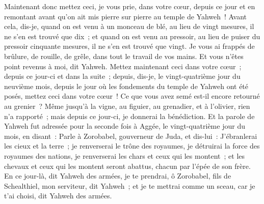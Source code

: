 \begin{multicols}{2}
Maintenant donc mettez ceci, je vous prie, dans votre cœur, depuis ce jour et en remontant avant qu'on ait mis pierre sur pierre au temple de Yahweh~!
Avant cela, dis-je, quand on est venu à un monceau de blé, au lieu de vingt mesures, il ne s'en est trouvé que dix~; et quand on est venu au pressoir, au lieu de puiser du pressoir cinquante mesures, il ne s'en est trouvé que vingt.
Je vous ai frappés de brûlure, de rouille, de grêle, dans tout le travail de vos mains. Et vous n'êtes point revenus à moi, dit Yahweh.
Mettez maintenant ceci dans votre cœur~; depuis ce jour-ci et dans la suite~; depuis, dis-je, le vingt-quatrième jour du neuvième mois, depuis le jour où les fondements du temple de Yahweh ont été posés, mettez ceci dans votre cœur~!
Ce que vous avez semé est-il encore retourné au grenier~? Même jusqu'à la vigne, au figuier, au grenadier, et à l'olivier, rien n'a rapporté~; mais depuis ce jour-ci, je donnerai la bénédiction.
Et la parole de Yahweh fut adressée pour la seconde fois à Aggée, le vingt-quatrième jour du mois, en disant~:
Parle à Zorobabel, gouverneur de Juda, et dis-lui~: J'ébranlerai les cieux et la terre~;
je renverserai le trône des royaumes, je détruirai la force des royaumes des nations, je renverserai les chars et ceux qui les montent~; et les chevaux et ceux qui les montent seront abattus, chacun par l'épée de son frère.
En ce jour-là, dit Yahweh des armées, je te prendrai, ô Zorobabel, fils de Schealthiel, mon serviteur, dit Yahweh~; et je te mettrai comme un sceau, car je t'ai choisi, dit Yahweh des armées.
\PPE{}
\end{multicols}
